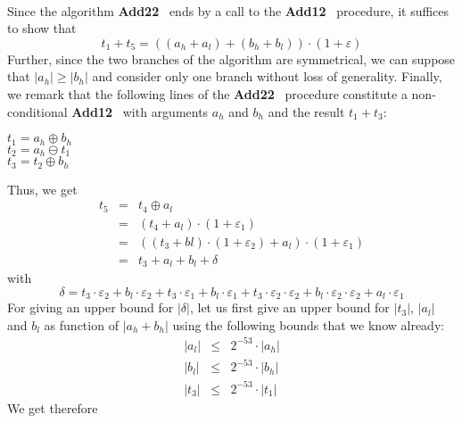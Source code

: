 \documentclass[a4paper,10pt,twoside]{article}
\newenvironment{proof}[1][Proof]{\begin{trivlist}
\item[\hskip \labelsep {\bfseries #1}]}{\end{trivlist}}
\newcommand{\hi}{\ensuremath{\mathit{h}}}
\newcommand{\lo}{\ensuremath{\mathit{l}}}
\newcommand{\Add}{{\bf Add12}}
\newcommand{\AddDD}{{\bf Add22}}
\renewcommand{\epsilon}{\varepsilon}
\begin{document}
\begin{proof} \label{AddDDpreuve} ~ \\
Since the algorithm \AddDD~ ends by a call to the \Add~ procedure, it suffices
to show that
$$t_1 + t_5 = \left(\left(a_\hi + a_\lo \right) + \left( b_\hi + b_\lo \right)\right) \cdot \left(1 + \epsilon\right)$$
Further, since the two branches of the algorithm are symmetrical, we can
suppose that $\left \vert a_\hi \right \vert \geq \left \vert b_\hi \right \vert$
and consider only one branch without loss of generality.
Finally, we remark that the following lines of the \AddDD~ procedure
constitute a non-conditional \Add~ with arguments $a_\hi$ and
$b_\hi$ and the result $t_1 + t_3$:
\begin{center}
\begin{minipage}[b]{50mm}
$t_1 = a_\hi \oplus b_\hi$ \\
$t_2 = a_\hi \ominus t_1$ \\
$t_3 = t_2 \oplus b_\hi$ 
\end{minipage}
\end{center}
Thus, we get
\begin{eqnarray*}
t_5 & = & t_4 \oplus a_\lo \\
& = & \left( t_4 + a_\lo \right) \cdot \left( 1 + \epsilon_1 \right) \\
& = & \left( \left( t_3 + bl \right) \cdot \left( 1 + \epsilon_2 \right) + a_\lo \right) \cdot \left( 1 + \epsilon_1 \right) \\
& = & t_3 + a_\lo + b_\lo + \delta
\end{eqnarray*}
with
$$\delta = t_3\cdot\epsilon_2 + b_\lo\cdot\epsilon_2 + t_3\cdot\epsilon_1 + b_\lo\cdot\epsilon_1 + t_3\cdot\epsilon_2\cdot\epsilon_2 
+ b_\lo\cdot\epsilon_2\cdot\epsilon_2 + a_\lo\cdot\epsilon_1$$
For giving an upper bound for $\left \vert \delta \right \vert$, let us first
give an upper bound for $\left \vert t_3 \right \vert$, $\left \vert a_\lo \right \vert$ and
$b_\lo$ as function of $\left \vert a_\hi + b_\hi \right \vert$ using the
following bounds that we know already:
\begin{eqnarray*}
\left \vert a_\lo \right \vert & \leq & 2^{-53} \cdot \left \vert a_\hi \right \vert \\
\left \vert b_\lo \right \vert & \leq & 2^{-53} \cdot \left \vert b_\hi \right \vert \\
\left \vert t_3 \right \vert & \leq & 2^{-53} \cdot \left \vert t_1 \right \vert 
\end{eqnarray*}
We get therefore
\begin{eqnarray*}

\end{eqnarray*}
\end{proof}
\end{document}
